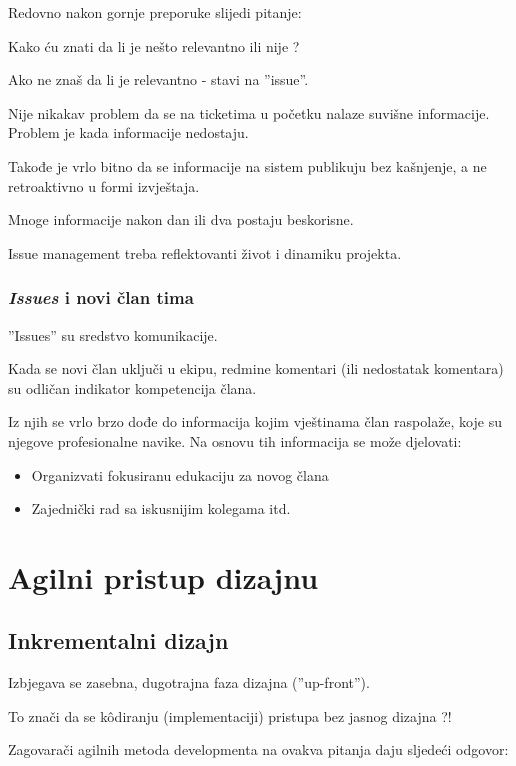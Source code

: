 \documentclass[lmodern, utf8, zavrsni]{fit}
\begin{document}
Redovno nakon gornje preporuke slijedi pitanje:

Kako ću znati da li je nešto relevantno  ili nije ?

Ako ne znaš da li je relevantno - stavi na ''issue''. 

Nije nikakav problem da se na ticketima u početku nalaze suvišne informacije. Problem je kada informacije nedostaju.

Takođe je vrlo bitno da se informacije na sistem publikuju bez kašnjenje, a ne retroaktivno u formi izvještaja.

Mnoge informacije nakon dan ili dva postaju beskorisne.

Issue management treba reflektovanti život i dinamiku projekta.

\subsection{\emph{Issues} i novi član tima}

''Issues'' su sredstvo komunikacije.

Kada se novi član uključi u ekipu, redmine komentari (ili nedostatak komentara) su odličan indikator kompetencija člana.

Iz njih se vrlo brzo dođe do informacija kojim vještinama član raspolaže, koje su njegove profesionalne navike. Na osnovu tih informacija se može djelovati: 
\begin{itemize}
  \item Organizvati fokusiranu edukaciju za novog člana
  \item Zajednički rad sa iskusnijim kolegama itd.
\end{itemize}

\chapter{Agilni pristup dizajnu}

\section{Inkrementalni dizajn}

Izbjegava se zasebna, dugotrajna faza dizajna (''up-front''). 

To znači da se k\^odiranju (implementaciji) pristupa bez jasnog dizajna ?!

Zagovarači agilnih metoda developmenta na ovakva pitanja daju sljedeći odgovor:
\end{document}
